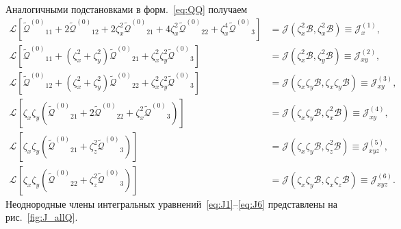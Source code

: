 \documentclass[a4paper,12pt]{article}
\newcommand{\QQ}{\ensuremath{\tilde{\mathcal{Q}}^{(0)}}}
\begin{document}
Аналогичными подстановками в форм.~\eqref{eq:QQ} получаем
\begin{align}
    \mathcal{L}\left[ \QQ_{11} + 2\QQ_{12} + 2\zeta_x^2\QQ_{21} + 4\zeta_x^2\QQ_{22} + \zeta_x^4\QQ_3 \right]
        &= \mathcal{J}\left( \zeta_x^2\mathcal{B}, \zeta_x^2\mathcal{B} \right) \equiv \mathcal{J}_{x}^{(1)}, \label{eq:J1}\\
    \mathcal{L}\left[ \QQ_{11} + (\zeta_x^2+\zeta_y^2)\QQ_{21} + \zeta_x^2\zeta_y^2\QQ_3 \right]
        &= \mathcal{J}\left( \zeta_x^2\mathcal{B}, \zeta_y^2\mathcal{B} \right) \equiv \mathcal{J}_{xy}^{(2)}, \label{eq:J2}\\
    \mathcal{L}\left[ \QQ_{12} + (\zeta_x^2+\zeta_y^2)\QQ_{22} + \zeta_x^2\zeta_y^2\QQ_3 \right]
        &= \mathcal{J}\left( \zeta_x\zeta_y\mathcal{B}, \zeta_x\zeta_y\mathcal{B} \right) \equiv \mathcal{J}_{xy}^{(3)}, \label{eq:J3}\\
    \mathcal{L}\left[ \zeta_x\zeta_y \left( \QQ_{21} + 2\QQ_{22} + \zeta_x^2\QQ_3 \right) \right]
        &= \mathcal{J}\left( \zeta_x\zeta_y\mathcal{B}, \zeta_x^2\mathcal{B} \right) \equiv \mathcal{J}_{xy}^{(4)}, \label{eq:J4}\\
    \mathcal{L}\left[ \zeta_x\zeta_y \left( \QQ_{21} + \zeta_z^2\QQ_3 \right) \right]
        &= \mathcal{J}\left( \zeta_x\zeta_y\mathcal{B}, \zeta_z^2\mathcal{B} \right) \equiv \mathcal{J}_{xyz}^{(5)}, \label{eq:J5}\\
    \mathcal{L}\left[ \zeta_x\zeta_y \left( \QQ_{22} + \zeta_z^2\QQ_3 \right) \right]
        &= \mathcal{J}\left( \zeta_x\zeta_y\mathcal{B}, \zeta_x\zeta_z\mathcal{B} \right) \equiv \mathcal{J}_{xyz}^{(6)}. \label{eq:J6}
\end{align}
Неоднородные члены интегральных уравнений~\eqref{eq:J1}--\eqref{eq:J6} представлены на рис.~\ref{fig:J_allQ}.
\end{document}
